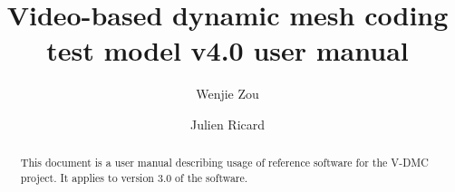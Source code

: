 \documentclass[a4paper,11pt]{mpegdoc}
\title{Video-based dynamic mesh coding test model v4.0 user manual}
\author{%
  Wenjie Zou \email{wjzou@xidian.edu.cn}
\and
  Julien Ricard	\email{julien.ricard@interdital.com} 
}
\begin{document}
\maketitle
\begin{abstract}
This document is a user manual describing usage of reference software
for the V-DMC project. It applies to version 3.0 of the software.
\end{abstract}
\newpage

\tableofcontents

\newpage









 



%
\end{document}
